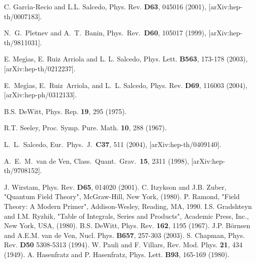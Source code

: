 \begin{thebibliography}{10}
C. Garc\'{\i}a-Recio and L.L. Salcedo, Phys. Rev. {\bf D63}, 045016 (2001), [arXiv:hep-th/0007183].


  N.~G.~Pletnev and A.~T.~Banin,
  Phys.\ Rev.\  {\bf D60}, 105017 (1999),
  [arXiv:hep-th/9811031].



E. Meg\'{\i}as, E. Ruiz Arriola and L. L. Salcedo,
  Phys. Lett. {\bf B563}, 173-178 (2003), [arXiv:hep-th/0212237].


E.~Meg{\'\i}as, E.~Ruiz~Arriola, and L.~L. Salcedo,
\newblock Phys. Rev. {\bf D69}, 116003 (2004), [arXiv:hep-ph/0312133].


B.S. DeWitt, Phys. Rep. {\bf 19}, 295 (1975).

R.T. Seeley, Proc. Symp. Pure. Math. {\bf 10}, 288 (1967).

  L.~L.~Salcedo,
  Eur.\ Phys.\ J.\  {\bf C37}, 511 (2004),
  [arXiv:hep-th/0409140].




  A.~E.~M.~van de Ven,
  Class.\ Quant.\ Grav.\  {\bf 15}, 2311 (1998),
  [arXiv:hep-th/9708152].


J. Wirstam, Phys. Rev. {\bf D65}, 014020 (2001).
C. Itzykson and J.B. Zuber, "Quantum Field Theory", McGraw-Hill, New York, (1980).
P. Ramond, "Field Theory: A Modern Primer", Addison-Wesley, Reading, MA, 1990.
I.S. Gradshteyn and I.M. Ryzhik, "Table of Integrals, Series and Products", Academic Press, Inc., New York, USA, (1980).
 B.S. DeWitt, Phys. Rev. {\bf 162}, 1195 (1967).
J.P. B\"ornsen and A.E.M. van de Ven, Nucl. Phys. {\bf B657}, 257-303 (2003).
S. Chapman, Phys. Rev. {\bf D50} 5308-5313 (1994).
W. Pauli and F. Villars, Rev. Mod. Phys. {\bf 21}, 434 (1949).
A. Hasenfratz and P. Hasenfratz, Phys. Lett. {\bf B93}, 165-169 (1980).


\end{thebibliography}
